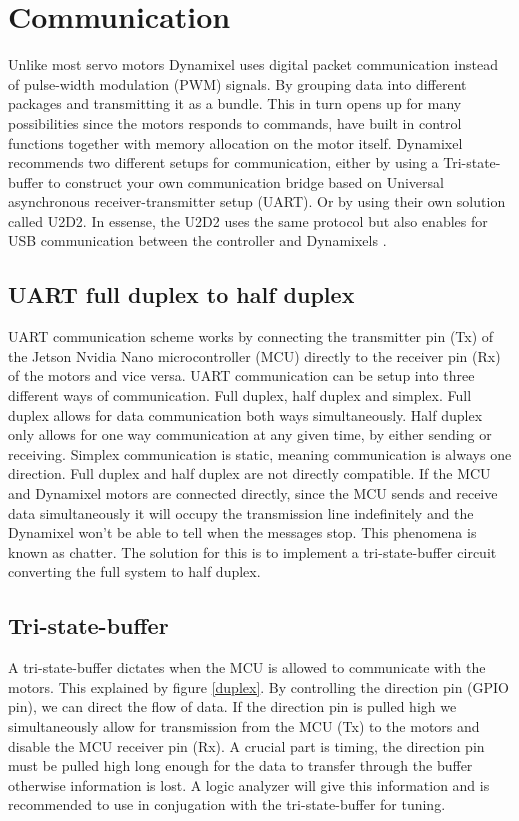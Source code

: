 \section*{Communication}
Unlike most servo motors Dynamixel uses digital packet communication instead of pulse-width modulation (PWM) signals.
By grouping data into different packages and transmitting it as a bundle.
This in turn opens up for many possibilities since the motors responds to commands,
have built in control functions together with memory allocation on the motor itself.
Dynamixel recommends two different setups for communication,
either by using a Tri-state-buffer to construct your own communication bridge  based on Universal asynchronous receiver-transmitter setup (UART). Or by using their own solution called U2D2.
In essense, the U2D2 uses the same protocol but also enables for USB communication between the controller and Dynamixels \cite{robotis}. 

\subsection{UART full duplex to half duplex}
UART communication scheme works by connecting the transmitter pin (Tx) of the Jetson Nvidia Nano microcontroller (MCU)
directly to the receiver pin (Rx) of the motors and vice versa.
UART communication can be setup into three different ways of communication.
Full duplex, half duplex and simplex.
Full duplex allows for data communication both ways simultaneously.
Half duplex only allows for one way communication at any given time, by either sending or receiving.
Simplex communication is static, meaning communication is always one direction.
\newline
Full duplex and half duplex are not directly compatible. 
If the MCU and Dynamixel motors are connected directly,
since the MCU sends and receive data simultaneously it will occupy the transmission line indefinitely and the Dynamixel won't be able to tell when the messages stop. 
This phenomena is known as chatter. 
The solution for this is to implement a tri-state-buffer circuit converting the full system to half duplex.

\subsection{Tri-state-buffer}

A tri-state-buffer dictates when the MCU is allowed to communicate with the motors. This explained  by figure \ref{duplex}.
By controlling the direction pin (GPIO pin),
we can direct the flow of data. 
If the direction pin is pulled high we simultaneously allow for transmission from the MCU (Tx) to the motors and disable the MCU receiver pin (Rx).
A crucial part is timing, the direction pin must be pulled high long enough for the data to transfer through the buffer otherwise information is lost.
A logic analyzer will give this information and is recommended to use in conjugation with the tri-state-buffer for tuning.

